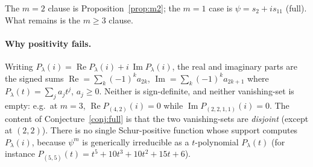 \documentclass[11pt]{article}
\theoremstyle{definition}
\theoremstyle{remark}
\DeclareMathOperator{\Real}{Re}
\DeclareMathOperator{\Imag}{Im}
\newcommand{\la}{\lambda}
\begin{document}
The $m=2$ clause is Proposition~\ref{prop:m2}; the $m=1$ case is
$\psi=s_2+is_{11}$ (full). What remains is the $m\ge3$ clause.

\paragraph{Why positivity fails.} Writing $P_\la(i)=\Real P_\la(i)+i\,\Imag
P_\la(i)$, the real and imaginary parts are the signed sums
$\Real=\sum_{k}(-1)^{k}a_{2k}$, $\Imag=\sum_{k}(-1)^{k}a_{2k+1}$ where
$P_\la(t)=\sum_j a_j t^j$, $a_j\ge0$. Neither is sign-definite, and neither
vanishing-set is empty: e.g.\ at $m=3$, $\Real P_{(4,2)}(i)=0$ while
$\Imag P_{(2,2,1,1)}(i)=0$. The content of Conjecture~\ref{conj:full} is that the
two vanishing-sets are \emph{disjoint} (except at $(2,2)$). There is no single
Schur-positive function whose support computes $P_\la(i)$, because $\psi^m$ is
generically irreducible as a $t$-polynomial $P_\la(t)$ (for instance
$P_{(5,5)}(t)=t^5+10t^3+10t^2+15t+6$).
\end{document}

